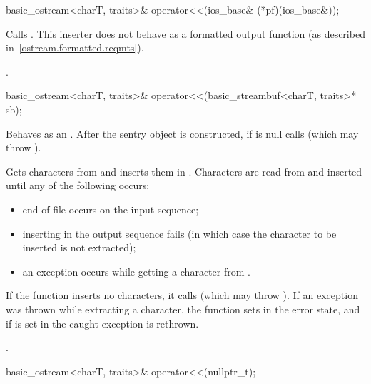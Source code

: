 %
\begin{itemdecl}
basic_ostream<charT, traits>& operator<<(ios_base& (*pf)(ios_base&));
\end{itemdecl}

\begin{itemdescr}
\pnum
\effects
Calls
.
This inserter does not
behave as a formatted output function (as described in~\ref{ostream.formatted.reqmts}).

\pnum
\returns
{}.
\end{itemdescr}

%
\begin{itemdecl}
basic_ostream<charT, traits>& operator<<(basic_streambuf<charT, traits>* sb);
\end{itemdecl}

\begin{itemdescr}
\pnum
\effects
Behaves as an .
After the sentry object is
constructed, if
 is null calls
(which may throw
).

\pnum
Gets characters from 
and inserts them in
.
Characters are read from 
and inserted until any of the following occurs:
\begin{itemize}
\item
end-of-file occurs on the input sequence;
\item
inserting in the output sequence fails
(in which case the character to be inserted is not extracted);
\item
an exception occurs while getting a character from .
\end{itemize}

\pnum
If the function inserts no characters, it calls
(which may throw
).
If an exception was thrown while extracting a character,
the function sets
in the error state, and if
is set in
the caught exception is rethrown.

\pnum
\returns
{}.
\end{itemdescr}

%
\begin{itemdecl}
basic_ostream<charT, traits>& operator<<(nullptr_t);
\end{itemdecl}

